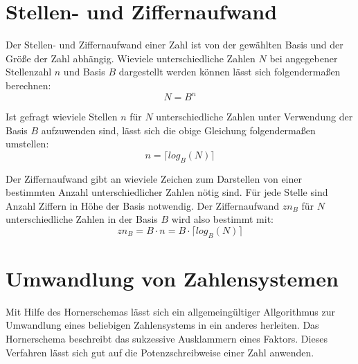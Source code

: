 \section{Stellen- und Ziffernaufwand}
Der Stellen- und Ziffernaufwand einer Zahl ist von der gewählten Basis und der Größe der Zahl abhängig. Wieviele unterschiedliche Zahlen $N$ bei angegebener Stellenzahl $n$ und Basis $B$ dargestellt werden können lässt sich folgendermaßen berechnen:
$$ 
	N = B^n 
$$

Ist gefragt wieviele Stellen $n$ für $N$ unterschiedliche Zahlen unter Verwendung der Basis $B$ aufzuwenden sind, lässt sich die obige Gleichung folgendermaßen umstellen:
$$
	n = \lceil log_B(N) \rceil
$$

Der Ziffernaufwand gibt an wieviele Zeichen zum Darstellen von einer bestimmten Anzahl unterschiedlicher Zahlen nötig sind. Für jede Stelle sind Anzahl Ziffern in Höhe der Basis notwendig. Der Ziffernaufwand $zn_B$ für $N$ unterschiedliche Zahlen in der Basis $B$ wird also bestimmt mit:
$$
	zn_B = B \cdot n = B \cdot \lceil log_B(N) \rceil
$$




\section{Umwandlung von Zahlensystemen}
Mit Hilfe des Hornerschemas lässt sich ein allgemeingültiger Allgorithmus zur Umwandlung eines beliebigen Zahlensystems in ein anderes herleiten. Das Hornerschema beschreibt das sukzessive Ausklammern eines Faktors. Dieses Verfahren lässt sich gut auf die Potenzschreibweise einer Zahl anwenden.

